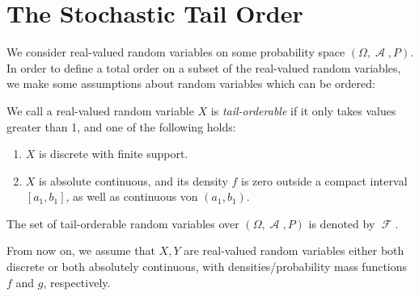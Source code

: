 \documentclass[a4paper]{scrreprt}
\DeclareMathOperator{\A}{\mathcal{A}}
\DeclareMathOperator{\leqtail}{\leq_{\text{tail}}}
\DeclareMathOperator{\F}{\mathcal{F}}
\begin{document}
    
    \setcounter{chapter}{4}
    

    \section{The Stochastic Tail Order}
    
    We consider real-valued random variables on some probability space $(\Omega, \A, P)$. In order to define a total order on a subset of the real-valued random variables, we make some assumptions about random variables which can be ordered:
    
    \begin{defn}
        We call a real-valued random variable $X$ is \emph{tail-orderable} if 
        it only takes values greater than 1, and
         one of the following holds:
        \begin{enumerate}
            \item $X$ is discrete with finite support.
            \item $X$ is absolute continuous, and its density $f$ is zero outside a compact interval $[a_1, b_1]$, as well as continuous von $(a_1, b_1)$.
        \end{enumerate} 
        The set of tail-orderable random variables over $(\Omega, \A, P)$ is denoted by $\F$.
    \end{defn}

    
    From now on, we assume that $X, Y$ are real-valued random variables either both discrete or both absolutely continuous, with densities/probability mass functions $f$ and $g$, respectively. %
    
    
    
\end{document}
